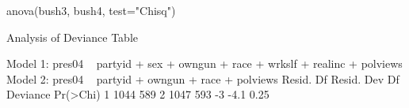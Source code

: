 \begin{Schunk}
\begin{Sinput}
  anova(bush3, bush4, test="Chisq")
\end{Sinput}
\begin{Soutput}
Analysis of Deviance Table

Model 1: pres04 ~ partyid + sex + owngun + race + wrkslf + realinc + polviews
Model 2: pres04 ~ partyid + owngun + race + polviews
  Resid. Df Resid. Dev Df Deviance Pr(>Chi)
1      1044        589                     
2      1047        593 -3     -4.1     0.25
\end{Soutput}
\end{Schunk}
